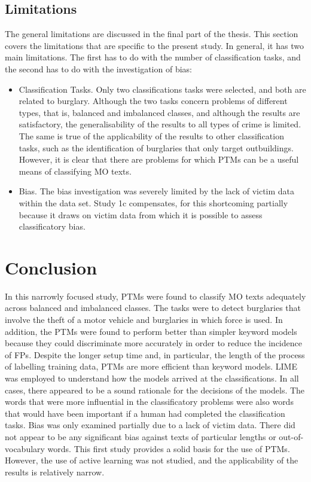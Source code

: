 \subsection{Limitations} The general limitations are discussed in the final part of the thesis. This section covers the limitations that are specific to the present study. In general, it has two main limitations. The first has to do with the number of classification tasks, and the second has to do with the investigation of bias:

\begin{itemize}
    \item Classification Tasks. Only two classifications tasks were selected, and both are related to burglary. Although the two tasks concern problems of different types, that is, balanced and imbalanced classes, and although the results are satisfactory, the generalisability of the results to all types of crime is limited. The same is true of the applicability of the results to other classification tasks, such as the identification of burglaries that only target outbuildings. However, it is clear that there are problems for which PTMs can be a useful means of classifying MO texts.
    
    \item Bias. The bias investigation was severely limited by the lack of victim data within the data set. Study 1c compensates, for this shortcoming partially because it draws on victim data from which it is possible to assess classificatory bias.
    
\end{itemize}

\section{Conclusion} In this narrowly focused study, PTMs were found to classify MO texts adequately across balanced and imbalanced classes. The tasks were to detect burglaries that involve the theft of a motor vehicle and burglaries in which force is used. In addition, the PTMs were found to perform better than simpler keyword models because they could discriminate more accurately in order to reduce the incidence of FPs. Despite the longer setup time and, in particular, the length of the process of labelling training data, PTMs are more efficient than keyword models. LIME was employed to understand how the models arrived at the classifications. In all cases, there appeared to be a sound rationale for the decisions of the models. The words that were more influential in the classificatory problems were also words that would have been important if a human had completed the classification tasks. Bias was only examined partially due to a lack of victim data. There did not appear to be any significant bias against texts of particular lengths or out-of-vocabulary words. This first study provides a solid basis for the use of PTMs. However, the use of active learning was not studied, and the applicability of the results is relatively narrow.

